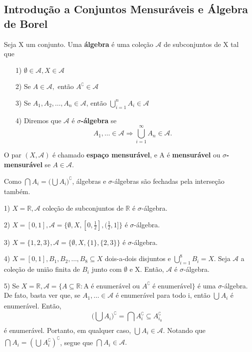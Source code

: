 \documentclass[measure_theory.tex]{subfiles}
\begin{document}
\subsection{Introdução a Conjuntos Mensuráveis e Álgebra de Borel}
\begin{def*}
	Seja X um conjunto. Uma \textbf{álgebra} é uma coleção \(\mathcal{A}\) de subconjuntos de X tal que
	\begin{itemize}
		\item[1)] \(\emptyset \in \mathcal{A}, X\in \mathcal{A}\)
		\item[2)] Se \(A\in \mathcal{A},\) então \(A ^{\complement}\in \mathcal{A}\)
		\item[3)] Se \(A_{1}, A_{2}, \dotsc , A_{n}\in \mathcal{A}\), então \(\bigcup_{i=1}^{n}A_{i}\in \mathcal{A}\)
		\item[4)] Diremos que \(\mathcal{A}\) é \textbf{\(\sigma \)-álgebra} se
		      \[
			      A_{1}, \dotsc \in \mathcal{A} \Rightarrow  \bigcup_{i=1}^{\infty}A_{n}\in \mathcal{A}.
		      \]
	\end{itemize}
	O par \((X, \mathcal{A})\) é chamado \textbf{espaço mensurável}, e A é \textbf{mensurável} ou \(\sigma \)\textbf{-mensurável} se \(A\in \mathcal{A}.\)
\end{def*}
Como \(\bigcap_{}^{}A_{i} = \biggl(\bigcup_{}^{}A_{i}\biggr) ^{\complement}\), álgebras e \(\sigma \)-álgebras são fechadas pela interseção também.
\begin{example}
	\item[1)] \(X = \mathbb{R}, \mathcal{A}\) coleção de subconjuntos de \(\mathbb{R}\) é \(\sigma \)-álgebra.
	\item[2)] \(X = [0, 1], \mathcal{A} = \{\emptyset , X, [0, \frac{1}{2}], (\frac{1}{2}, 1]\}\) é \(\sigma \)-álgebra.
	\item[3)] \(X = \{1, 2, 3\}, \mathcal{A} = \{\emptyset , X, \{1\}, \{2, 3\}\}\) é \(\sigma\)-álgebra.
	\item[4)] \(X = [0, 1], B_{1}, B_{2}, \dotsc , B_{8}\subseteq X\) dois-a-dois disjuntos e \(\bigcup_{i=1}^{8}B_{i} = X.\) Seja \(\mathcal{A}\) a coleção de
	união finita de \(B_{i}\) junto com \(\emptyset \) e X. Então, \(\mathcal{A}\) é \(\sigma \)-álgebra.
	\item[5)] Se \(X = \mathbb{R}, \mathcal{A} = \{A\subseteq \mathbb{R}: \text{A é enumerável ou }A ^{\complement} \text{ é enumerável}\} \) é uma \(\sigma \)-álgebra. De fato,
	basta ver que, se \(A_{1}, \dotsc \in \mathcal{A}\) é enumerável para todo i, então \(\bigcup_{}^{}A_{i}\) é enumerável. Então,
	\[
		\biggl(\bigcup_{}^{}A_{i}\biggr) ^{\complement} = \bigcap_{}^{}A_{i}^{\complement} \subseteq A_{i_{0}}^{\complement}
	\]
	é enumerável. Portanto, em qualquer caso, \(\bigcup_{}^{}A_{i}\in \mathcal{A}.\) Notando que \(\bigcap_{}^{}A_{i} = (\bigcup_{}^{}A_{i}^{\complement})^{\complement}\), segue que \(\bigcap_{}^{}A_{i}\in \mathcal{A}.\)
\end{example}
\end{document}
